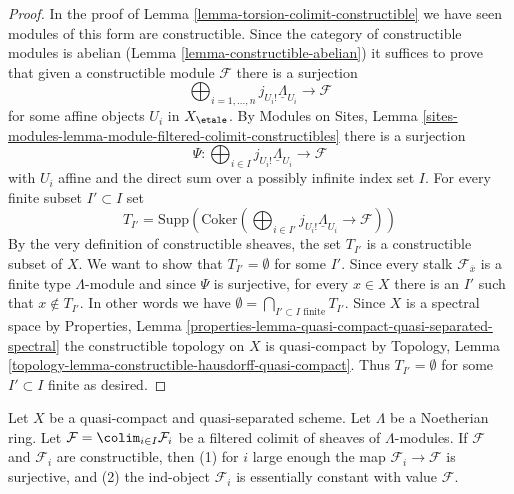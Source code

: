 \begin{proof}
In the proof of Lemma \ref{lemma-torsion-colimit-constructible}
we have seen modules of this form are constructible. Since the
category of constructible modules is abelian
(Lemma \ref{lemma-constructible-abelian})
it suffices to prove that given a constructible module $\mathcal{F}$
there is a surjection
$$
\bigoplus\nolimits_{i = 1, \ldots, n} j_{U_i!}\underline{\Lambda}_{U_i}
\longrightarrow \mathcal{F}
$$
for some affine objects $U_i$ in $X_\etale$. By
Modules on Sites, Lemma
\ref{sites-modules-lemma-module-filtered-colimit-constructibles}
there is a surjection
$$
\Psi :
\bigoplus\nolimits_{i \in I} j_{U_i!}\underline{\Lambda}_{U_i}
\longrightarrow
\mathcal{F}
$$
with $U_i$ affine and the direct sum over a possibly infinite
index set $I$. For every finite subset $I' \subset I$ set
$$
T_{I'} = \text{Supp}(\text{Coker}(
\bigoplus\nolimits_{i \in I'} j_{U_i!}\underline{\Lambda}_{U_i}
\longrightarrow \mathcal{F}))
$$
By the very definition of constructible sheaves, the set $T_{I'}$
is a constructible subset of $X$. We want to show that $T_{I'} = \emptyset$
for some $I'$. Since every stalk $\mathcal{F}_{\overline{x}}$ is
a finite type $\Lambda$-module and since $\Psi$ is surjective, for
every $x \in X$ there is an $I'$ such that $x \not \in T_{I'}$.
In other words we have
$\emptyset = \bigcap_{I' \subset I\text{ finite}} T_{I'}$. Since
$X$ is a spectral space by Properties, Lemma
\ref{properties-lemma-quasi-compact-quasi-separated-spectral}
the constructible topology on $X$ is quasi-compact by
Topology, Lemma \ref{topology-lemma-constructible-hausdorff-quasi-compact}.
Thus $T_{I'} = \emptyset$ for some $I' \subset I$ finite
as desired.
\end{proof}

\begin{lemma}
\label{lemma-colimit-constructible}
Let $X$ be a quasi-compact and quasi-separated scheme.
Let $\Lambda$ be a Noetherian ring.
Let $\mathcal{F} = \colim_{i \in I} \mathcal{F}_i$ be a filtered colimit of
sheaves of $\Lambda$-modules. If $\mathcal{F}$ and $\mathcal{F}_i$
are constructible, then (1) for $i$ large enough the map
$\mathcal{F}_i \to \mathcal{F}$ is surjective, and (2) the ind-object
$\mathcal{F}_i$ is essentially constant with value $\mathcal{F}$.
\end{lemma}

